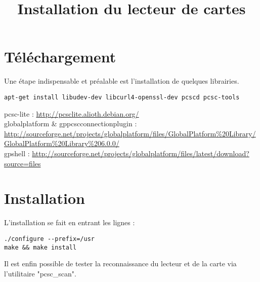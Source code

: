 \documentclass[a4paper,11pt,french]{article}
\title{Installation du lecteur de cartes}
\begin{document}
\maketitle

\section{Téléchargement}
Une étape indispensable et préalable est l'installation de quelques librairies.
\begin{verbatim}
apt-get install libudev-dev libcurl4-openssl-dev pcscd pcsc-tools
\end{verbatim}

pcsc-lite : \url{http://pcsclite.alioth.debian.org/}\\
globalplatform \& gppcscconnectionplugin : \url{http://sourceforge.net/projects/globalplatform/files/GlobalPlatform%20Library/GlobalPlatform%20Library%206.0.0/}\\
gpshell : \url{http://sourceforge.net/projects/globalplatform/files/latest/download?source=files}

\section{Installation}
L'installation se fait en entrant les lignes :
\begin{verbatim}
./configure --prefix=/usr
make && make install
\end{verbatim}

Il est enfin possible de tester la reconnaissance du lecteur et de la carte
via l'utilitaire "pcsc\_scan".
\end{document}
